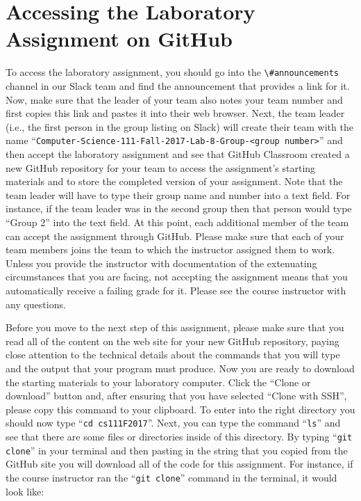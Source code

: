 \documentclass[11pt]{article}
\newcommand{\command}[1]{``\lstinline{#1}''}
\newcommand{\channel}[1]{\lstinline{#1}}
\begin{document}
\section*{Accessing the Laboratory Assignment on GitHub}

To access the laboratory assignment, you should go into the \channel{\#announcements} channel in our Slack team and find
the announcement that provides a link for it. Now, make sure that the leader of your team also notes your team number
and first copies this link and pastes it into their web browser. Next, the team leader (i.e., the first person in the
group listing on Slack) will create their team with the name \command{Computer-Science-111-Fall-2017-Lab-8-Group-<group
number>} and then accept the laboratory assignment and see that GitHub Classroom created a new GitHub repository for
your team to access the assignment's starting materials and to store the completed version of your assignment. Note that
the team leader will have to type their group name and number into a text field. For instance, if the team leader was in
the second group then that person would type ``Group 2'' into the text field. At this point, each additional member of
the team can accept the assignment through GitHub. Please make sure that each of your team members joins the team to
which the instructor assigned them to work. Unless you provide the instructor with documentation of the extenuating
circumstances that you are facing, not accepting the assignment means that you automatically receive a failing grade for
it. Please see the course instructor with any questions.

Before you move to the next step of this assignment, please make sure that you read all of the content on the web site
for your new GitHub repository, paying close attention to the technical details about the commands that you will type
and the output that your program must produce. Now you are ready to download the starting materials to your laboratory
computer. Click the ``Clone or download'' button and, after ensuring that you have selected ``Clone with SSH'', please
copy this command to your clipboard. To enter into the right directory you should now type \command{cd cs111F2017}.
Next, you can type the command \command{ls} and see that there are some files or directories inside of this directory.
By typing \command{git clone} in your terminal and then pasting in the string that you copied from the GitHub site you
will download all of the code for this assignment. For instance, if the course instructor ran the \command{git clone}
command in the terminal, it would look like:
\end{document}
